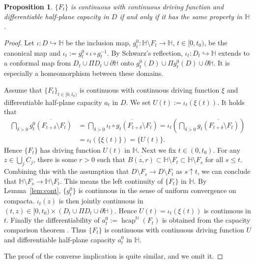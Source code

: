 \documentclass[preprint,12pt]{elsarticle}
\newtheorem{prop}[thm]{Proposition}
\theoremstyle{definition}
\newcommand{\uhp}{\mathbb{H}}
\DeclareMathOperator{\hcap}{hcap}
\begin{document}
\begin{prop} \label{prop:cont}
$\{F_t\}$ is continuous with continuous driving function
and differentiable half-plane capacity in $D$
if and only if it has the same property in $\uhp$.
\end{prop}

\begin{proof}
Let $\iota \colon D \hookrightarrow \uhp$ be the inclusion map,
$g^0_t \colon \uhp \setminus F_t \to \uhp$, $t \in [0, t_0)$, be the canonical map
and $\iota_t := g^0_t \circ \iota \circ g_t^{-1}$.
By Schwarz's reflection, $\iota_t \colon D_t \hookrightarrow \uhp$ extends
to a conformal map from $D_t \cup \Pi D_t \cup \partial \uhp$
onto $g^0_t(D) \cup \Pi g^0_t(D) \cup \partial \uhp$.
It is especially a homeomorphism between these domains.

Assume that $\{F_t\}_{t \in [0,t_0)}$ is continuous
with continuous driving function $\xi$ and differentiable half-plane capacity $a_t$
in $D$.
We set $U(t):=\iota_t(\xi(t))$.
It holds that
\begin{align*}
\bigcap_{\delta>0}\overline{g^0_t(F_{t+\delta} \setminus F_t)}
&=\bigcap_{\delta>0}\overline{\iota_t \circ g_t(F_{t+\delta} \setminus F_t)} 
=\iota_t\left(\bigcap_{\delta>0}\overline{g_t(F_{t+\delta} \setminus F_t)}\right) \\
&=\iota_t(\{\xi(t)\}) =\{U(t)\}.
\end{align*}
Hence $\{F_t\}$ has driving function $U(t)$ in $\uhp$.
Next we fix $t \in (0, t_0)$.
For any $z \in \bigcup_j C_j$, there is some $r>0$ such that
$\overline{B(z, r)} \subset \uhp \setminus F_t \subset \uhp \setminus F_s$
for all $s \leq t$.
Combining this with the assumption that $D \setminus F_s \to D \setminus F_t$
as $s \uparrow t$,
we can conclude that $\uhp \setminus F_s \to \uhp \setminus F_t$.
This means the left continuity of $\{F_t\}$ in $\uhp$.
By Lemma~\ref{lem:cont}, $\{g^0_t\}$ is continuous in
the sense of uniform convergence on compacta.
$\iota_t(z)$ is then jointly continuous
in $(t,z) \in [0, t_0) \times (D_t \cup \Pi D_t \cup \partial \uhp)$.
Hence $U(t)=\iota_t(\xi(t))$ is continuous in $t$.
Finally the differentiability of $a^0_t:=\hcap^{\uhp}(F_t)$ is obtained from
the capacity comparison theorem \cite[Theorem~A.1]{CF18}.
Thus $\{F_t\}$ is continuous with continuous driving function $U$
and differentiable half-plane capacity $a^0_t$ in $\uhp$.

The proof of the converse implication is quite similar, and we omit it.
\end{proof}
\end{document}
